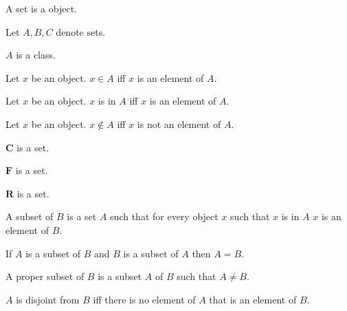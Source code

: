 \documentclass{article}
\newcommand{\Rank}{\mathbf{R}} %
\newcommand{\File}{\mathbf{F}} %
\newcommand{\Checkerboard}{\mathbf{C}}
\begin{document}
\begin{forthel}

    \begin{signature}
        A set is a object.
    \end{signature}
    
    Let $A,B,C$ denote sets.

    \begin{axiom}
        $A$ is a class.
    \end{axiom}

    \begin{definition}
        Let $x$ be an object. $x \in A$ iff $x$ is an element of $A$.
    \end{definition}
    
    \begin{definition}
        Let $x$ be an object. $x$ is in $A$ iff $x$ is an element of $A$.
    \end{definition}
    
    \begin{definition}
        Let $x$ be an object. $x \notin A$ iff $x$ is not an element of $A$.
    \end{definition}

    \begin{axiom} $\Checkerboard$ is a set. \end{axiom}
    \begin{axiom} $\File$ is a set. \end{axiom}
    \begin{axiom} $\Rank$ is a set. \end{axiom}

    \begin{definition}
        A subset of $B$ is a set $A$ such that
        for every object $x$ such that $x$ is in $A$
        $x$ is an element of $B$.
    \end{definition}

    \begin{axiom}[Extensionality]
        If $A$ is a subset of $B$ and
        $B$ is a subset of $A$ then $A = B$.
    \end{axiom}

    \begin{definition}
        A proper subset of $B$ is a subset $A$ of $B$ such that $A\neq B$.
    \end{definition}

    \begin{definition}
        $A$ is disjoint from $B$ iff there is no element of $A$ that is an element of $B$.
    \end{definition}


\end{forthel}
\end{document}
